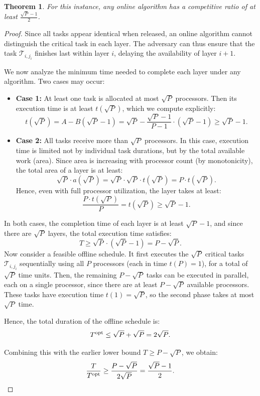 \documentclass{article}
\newtheorem{theorem}{Theorem}
\newcommand\task{\mathcal{T}}
\newcommand\opt{\textnormal{opt}\xspace}
\begin{document}
\begin{theorem}
\label{thm.lowerbound}
For this instance, any online algorithm has a competitive ratio of at least \( \frac{\sqrt{P}-1}{2} \).
\end{theorem}

\begin{proof}
Since all tasks appear identical when released, an online algorithm cannot distinguish the critical task in each layer. The adversary can thus ensure that the task \( \task_{i,j_i} \) finishes last within layer \( i \), delaying the availability of layer \( i+1 \).

We now analyze the minimum time needed to complete each layer under any algorithm. Two cases may occur:

\begin{itemize}
    \item \textbf{Case 1:} At least one task is allocated at most \( \sqrt{P} \) processors. Then its execution time is at least \( t(\sqrt{P}) \), which we compute explicitly:
    \[
    t(\sqrt{P}) = A - B(\sqrt{P} - 1) = \sqrt{P} - \frac{\sqrt{P} - 1}{P - 1} \cdot (\sqrt{P} - 1) \ge \sqrt{P} - 1.
    \]

    \item \textbf{Case 2:} All tasks receive more than \( \sqrt{P} \) processors. In this case, execution time is limited not by individual task durations, but by the total available work (area). Since area is increasing with processor count (by monotonicity), the total area of a layer is at least:
    \[
    \sqrt{P} \cdot a(\sqrt{P}) = \sqrt{P} \cdot \sqrt{P} \cdot t(\sqrt{P}) = P \cdot t(\sqrt{P}).
    \]
    Hence, even with full processor utilization, the layer takes at least:
    \[
    \frac{P \cdot t(\sqrt{P})}{P} = t(\sqrt{P}) \ge \sqrt{P} - 1.
    \]
\end{itemize}

In both cases, the completion time of each layer is at least \( \sqrt{P} - 1 \), and since there are \( \sqrt{P} \) layers, the total execution time satisfies:
\[
T \ge \sqrt{P} \cdot (\sqrt{P} - 1) = P - \sqrt{P}.
\]
Now consider a feasible offline schedule. It first executes the \( \sqrt{P} \) critical tasks \( \task_{i,j_i} \) sequentially using all \( P \) processors (each in time \( t(P) = 1 \)), for a total of \( \sqrt{P} \) time units. Then, the remaining \( P - \sqrt{P} \) tasks can be executed in parallel, each on a single processor, since there are at least \( P - \sqrt{P} \) available processors. These tasks have execution time \( t(1) = \sqrt{P} \), so the second phase takes at most \( \sqrt{P} \) time.

Hence, the total duration of the offline schedule is:
\[
T^{\opt} \le \sqrt{P} + \sqrt{P} = 2\sqrt{P}.
\]

Combining this with the earlier lower bound \( T \ge P - \sqrt{P} \), we obtain:
\[
\frac{T}{T^{\opt}} \ge \frac{P - \sqrt{P}}{2\sqrt{P}} =\frac{\sqrt{P}-1}{2}.
\]

\end{proof}
\end{document}

